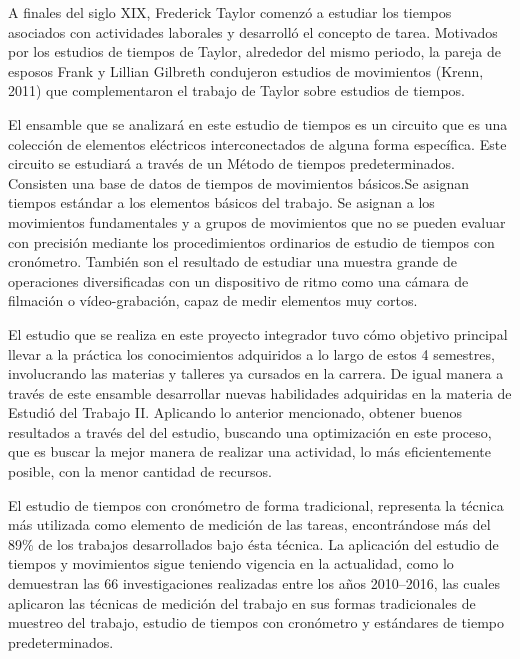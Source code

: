         A finales del siglo XIX, Frederick Taylor comenzó a estudiar los tiempos asociados con actividades laborales y desarrolló el concepto de tarea. Motivados por los estudios de tiempos de Taylor, alrededor del mismo periodo, la pareja de esposos Frank y Lillian Gilbreth condujeron estudios de movimientos (Krenn, 2011) que complementaron el trabajo de Taylor sobre estudios de tiempos. 
        \cite{andrade2019estudio}
        
        El ensamble que se analizará en este estudio de tiempos es un circuito  que es una colección de elementos eléctricos interconectados de alguna forma específica. Este circuito se estudiará a través de un Método de tiempos predeterminados. Consisten una base de datos de tiempos de movimientos básicos.Se asignan tiempos estándar a los elementos básicos del trabajo. Se asignan a los movimientos fundamentales y a grupos de movimientos que no se pueden evaluar con precisión mediante los procedimientos ordinarios de estudio de tiempos con cronómetro. También son el resultado de estudiar una muestra grande de operaciones diversificadas con un dispositivo de ritmo como una cámara de filmación o vídeo-grabación, capaz de medir elementos muy cortos.
        
        El estudio que se realiza en este proyecto integrador tuvo cómo objetivo principal llevar a la práctica los conocimientos adquiridos a lo largo de estos 4 semestres, involucrando las materias y talleres ya cursados en la carrera. De igual manera a través de este ensamble desarrollar nuevas habilidades adquiridas en la materia de Estudió del Trabajo II. Aplicando lo anterior mencionado, obtener buenos resultados a través del del estudio, buscando  una optimización en este proceso, que es buscar la mejor manera de realizar una actividad, lo más eficientemente posible, con la menor cantidad de recursos.
        
        El estudio de tiempos con cronómetro de forma tradicional, representa la técnica más utilizada como elemento de medición de las tareas, encontrándose más del 89\% de los trabajos desarrollados bajo ésta técnica.
        La aplicación del estudio de tiempos y movimientos sigue teniendo vigencia en la actualidad, como lo demuestran las 66 investigaciones realizadas entre los años 2010–2016, las cuales aplicaron las técnicas de medición del trabajo en sus formas tradicionales de muestreo del trabajo, estudio de tiempos con cronómetro y estándares de tiempo predeterminados.
        
         
